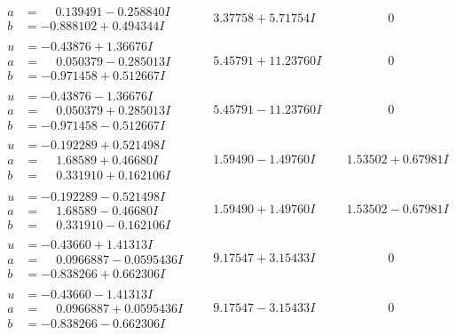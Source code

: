 \documentclass[1p]{elsarticle_modified}
\theoremstyle{definition}
\begin{document}
$$\begin{array}{c|c|c}
\begin{aligned}
a &= \phantom{-}0.139491 - 0.258840 I \\
b &= -0.888102 + 0.494344 I\end{aligned}
 & \phantom{-}3.37758 + 5.71754 I & \phantom{-0.000000 } 0 \\ \hline\begin{aligned}
u &= -0.43876 + 1.36676 I \\
a &= \phantom{-}0.050379 - 0.285013 I \\
b &= -0.971458 + 0.512667 I\end{aligned}
 & \phantom{-}5.45791 + 11.23760 I & \phantom{-0.000000 } 0 \\ \hline\begin{aligned}
u &= -0.43876 - 1.36676 I \\
a &= \phantom{-}0.050379 + 0.285013 I \\
b &= -0.971458 - 0.512667 I\end{aligned}
 & \phantom{-}5.45791 - 11.23760 I & \phantom{-0.000000 } 0 \\ \hline\begin{aligned}
u &= -0.192289 + 0.521498 I \\
a &= \phantom{-}1.68589 + 0.46680 I \\
b &= \phantom{-}0.331910 + 0.162106 I\end{aligned}
 & \phantom{-}1.59490 - 1.49760 I & \phantom{-}1.53502 + 0.67981 I \\ \hline\begin{aligned}
u &= -0.192289 - 0.521498 I \\
a &= \phantom{-}1.68589 - 0.46680 I \\
b &= \phantom{-}0.331910 - 0.162106 I\end{aligned}
 & \phantom{-}1.59490 + 1.49760 I & \phantom{-}1.53502 - 0.67981 I \\ \hline\begin{aligned}
u &= -0.43660 + 1.41313 I \\
a &= \phantom{-}0.0966887 - 0.0595436 I \\
b &= -0.838266 + 0.662306 I\end{aligned}
 & \phantom{-}9.17547 + 3.15433 I & \phantom{-0.000000 } 0 \\ \hline\begin{aligned}
u &= -0.43660 - 1.41313 I \\
a &= \phantom{-}0.0966887 + 0.0595436 I \\
b &= -0.838266 - 0.662306 I\end{aligned}
 & \phantom{-}9.17547 - 3.15433 I & \phantom{-0.000000 } 0\\

\end{array}$$
\end{document}
